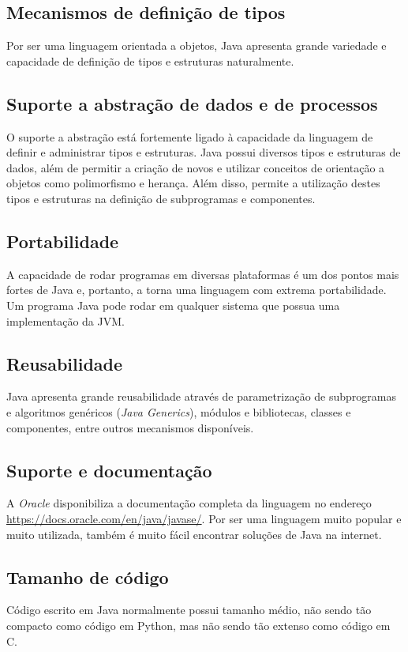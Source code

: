 \documentclass[12pt]{article}
\begin{document}
\subsection{Mecanismos de definição de tipos}
Por ser uma linguagem orientada a objetos, Java apresenta grande variedade e capacidade de definição de tipos e estruturas naturalmente.

\subsection{Suporte a abstração de dados e de processos}
O suporte a abstração está fortemente ligado à capacidade da linguagem de definir e administrar tipos e estruturas. Java possui diversos tipos e estruturas de dados, além de permitir a criação de novos e utilizar conceitos de orientação a objetos como polimorfismo e herança. Além disso, permite a utilização destes tipos e estruturas na definição de subprogramas e componentes.

\subsection{Portabilidade}
A capacidade de rodar programas em diversas plataformas é um dos pontos mais fortes de Java e, portanto, a torna uma linguagem com extrema portabilidade. Um programa Java pode rodar em qualquer sistema que possua uma implementação da JVM.

\subsection{Reusabilidade}
Java apresenta grande reusabilidade através de parametrização de subprogramas e algoritmos genéricos (\textit{Java Generics}), módulos e bibliotecas, classes e componentes, entre outros mecanismos disponíveis.

\subsection{Suporte e documentação}
A \textit{Oracle} disponibiliza a documentação completa da linguagem no endereço \url{https://docs.oracle.com/en/java/javase/}. Por ser uma linguagem muito popular e muito utilizada, também é muito fácil encontrar soluções de Java na internet.

\subsection{Tamanho de código}
Código escrito em Java normalmente possui tamanho médio, não sendo tão compacto como código em Python, mas não sendo tão extenso como código em C.
\end{document}
